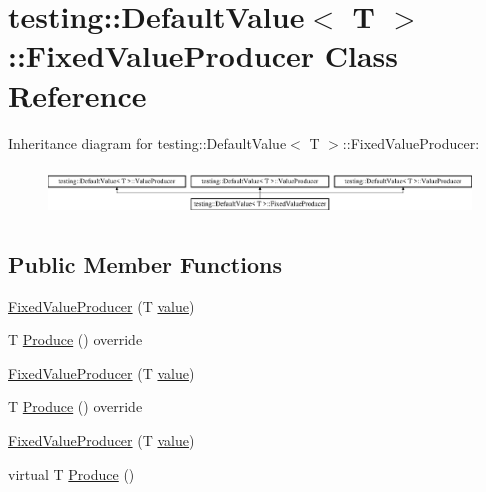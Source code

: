 \hypertarget{classtesting_1_1_default_value_1_1_fixed_value_producer}{}\section{testing\+::Default\+Value$<$ T $>$\+::Fixed\+Value\+Producer Class Reference}
\label{classtesting_1_1_default_value_1_1_fixed_value_producer}
Inheritance diagram for testing\+::Default\+Value$<$ T $>$\+::Fixed\+Value\+Producer\+:\begin{figure}[H]
\begin{center}
\leavevmode
\includegraphics[height=1.291811cm]{d7/d36/classtesting_1_1_default_value_1_1_fixed_value_producer}
\end{center}
\end{figure}
\subsection*{Public Member Functions}
\begin{DoxyCompactItemize}
\item 
\mbox{\hyperlink{classtesting_1_1_default_value_1_1_fixed_value_producer_a694f403694251385d385587b61a4ac95}{Fixed\+Value\+Producer}} (T \mbox{\hyperlink{_obj__test_2lib_2googletest-master_2googlemock_2test_2gmock-matchers__test_8cc_a337b8a670efc0b086ad3af163f3121b6}{value}})
\item 
T \mbox{\hyperlink{classtesting_1_1_default_value_1_1_fixed_value_producer_a896da438af897dea6a473a11581aac10}{Produce}} () override
\item 
\mbox{\hyperlink{classtesting_1_1_default_value_1_1_fixed_value_producer_a694f403694251385d385587b61a4ac95}{Fixed\+Value\+Producer}} (T \mbox{\hyperlink{_obj__test_2lib_2googletest-master_2googlemock_2test_2gmock-matchers__test_8cc_a337b8a670efc0b086ad3af163f3121b6}{value}})
\item 
T \mbox{\hyperlink{classtesting_1_1_default_value_1_1_fixed_value_producer_a896da438af897dea6a473a11581aac10}{Produce}} () override
\item 
\mbox{\hyperlink{classtesting_1_1_default_value_1_1_fixed_value_producer_a694f403694251385d385587b61a4ac95}{Fixed\+Value\+Producer}} (T \mbox{\hyperlink{_obj__test_2lib_2googletest-master_2googlemock_2test_2gmock-matchers__test_8cc_a337b8a670efc0b086ad3af163f3121b6}{value}})
\item 
virtual T \mbox{\hyperlink{classtesting_1_1_default_value_1_1_fixed_value_producer_ad7f695192e9dbc5f54cdb405655e7125}{Produce}} ()
\end{DoxyCompactItemize}
